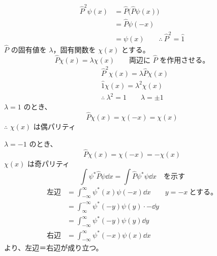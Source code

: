 \begin{align*}
\hat{P}^{2}\psi(x)&=\hat{P}\bigl(\hat{P}\psi(x)\bigr)\\
&=\hat{P}\psi(-x)\\
&=\psi(x)\qquad\therefore\ \hat{P}^{2}=\hat{1}
\end{align*}
$\hat{P}$ の固有値を $\lambda$，固有関数を $\chi(x)$ とする。
\[ \hat{P}\chi(x)=\lambda\chi(x)\qquad\text{両辺に $\hat{P}$ を作用させる。} \]
\begin{align*}
&\hat{P}^{2}\chi(x)=\lambda\hat{P}\chi(x)\\
&\hat{1}\chi(x)=\lambda^{2}\chi(x)\\
&\therefore\ \lambda^{2}=1\qquad\lambda=\pm1
\end{align*}
$\lambda=1$ のとき、
\[ \hat{P}\chi(x)=\chi(-x)=\chi(x) \]
$\therefore$ $\chi(x)$ は偶パリティ

$\lambda=-1$ のとき、
\[ \hat{P}\chi(x)=\chi(-x)=-\chi(x) \]
$\chi(x)$ は奇パリティ
\[ \int\psi^{*}\hat{P}\psi\dd x=\int\hat{P}\psi^{*}\psi\dd x\quad\text{を示す} \]
\begin{align*}
\text{左辺}&=\int_{-\infty}^{\infty}\psi^{*}(x)\psi(-x)\dd x\qquad y=-x\ \text{とする。}\\
&=\int_{\infty}^{-\infty}\psi^{*}(-y)\psi(y)\cdot{-\dd y}\\
&=\int_{-\infty}^{\infty}\psi^{*}(-y)\psi(y)\dd y\\
\text{右辺}&=\int_{-\infty}^{\infty}\psi^{*}(-x)\psi(x)\dd x
\end{align*}
より、左辺＝右辺が成り立つ。

